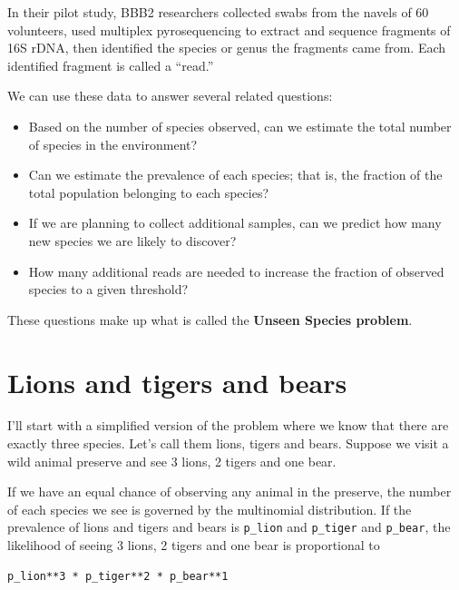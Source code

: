 \documentclass[12pt]{book}
\begin{document}
In their pilot study, BBB2 researchers collected swabs from the navels
of 60 volunteers, used multiplex pyrosequencing to extract and sequence
fragments of 16S rDNA, then identified the species or genus the
fragments came from.  Each identified fragment is called a ``read.''

We can use these data to answer several related questions:

\begin{itemize}

\item Based on the number of species observed, can we estimate
  the total number of species in the environment?

\item Can we estimate the prevalence of each species; that is, the
  fraction of the total population belonging to each species?

\item If we are planning to collect additional samples, can we predict
  how many new species we are likely to discover?

\item How many additional reads are needed to increase the
  fraction of observed species to a given threshold?

\end{itemize}

These questions make up what is called the {\bf Unseen Species problem}.


\section{Lions and tigers and bears}

I'll start with a simplified version of the problem where we know that
there are exactly three species.  Let's call them lions, tigers and
bears.  Suppose we visit a wild animal preserve and see 3 lions, 2
tigers and one bear.

If we have an equal chance of observing any animal in the preserve,
the number of each species we see is governed by the multinomial
distribution.  If the prevalence of lions and tigers and bears is
\verb"p_lion" and \verb"p_tiger" and \verb"p_bear", the likelihood of
seeing 3 lions, 2 tigers and one bear is proportional to

\begin{verbatim}
p_lion**3 * p_tiger**2 * p_bear**1
\end{verbatim}
\end{document}
